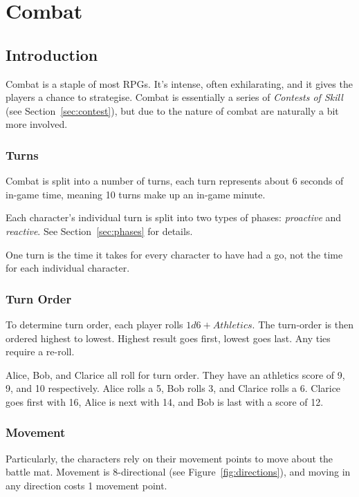 \chapter{Combat}\label{chap:combat}
\section{Introduction}
Combat is a staple of most RPGs. 
It's intense, often exhilarating, and it gives the players a chance to strategise.
Combat is essentially a series of \textit{Contests of Skill} (see Section~\ref{sec:contest}), but due to the nature of combat are naturally a bit more involved.

\subsection{Turns}
Combat is split into a number of turns, each turn represents about 6 seconds of in-game time, meaning 10 turns make up an in-game minute.

Each character's individual turn is split into two types of phases: \textit{proactive} and \textit{reactive}.
See Section~\ref{sec:phases} for details.

\note One turn is the time it takes for every character to have had a go, not the time for each individual character.

\subsection{Turn Order}
To determine turn order, each player rolls $1d6 + \mathit{Athletics}$. 
The turn-order is then ordered highest to lowest. 
Highest result goes first, lowest goes last. 
Any ties require a re-roll.

\example Alice, Bob, and Clarice all roll for turn order. 
They have an athletics score of 9, 9, and 10 respectively. 
Alice rolls a 5, Bob rolls 3, and Clarice rolls a 6. 
Clarice goes first with 16, Alice is next with 14, and Bob is last with a score of 12.

\subsection{Movement}\label{sec:movement}
Particularly, the characters rely on their movement points to move about the battle mat.
Movement is 8-directional (see Figure~\ref{fig:directions}), and moving in any direction costs 1 movement point.

